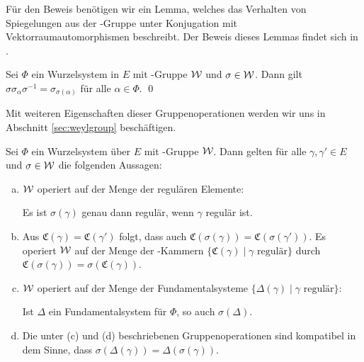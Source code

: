Für den Beweis benötigen wir ein Lemma, welches das Verhalten von Spiegelungen aus der \weyl\hyp{}Gruppe unter Konjugation mit Vektorraumautomorphismen beschreibt. 
Der Beweis dieses Lemmas findet sich in \cite[S.43]{humphreys1972introduction}.

\begin{lem}
  \label{lem:conjReflection}
  Sei $\Phi$ ein Wurzelsystem in $E$ mit \weyl\hyp{}Gruppe $\mathcal{W}$ und $\sigma \in \mathcal{W}$.
  Dann gilt $\sigma \sigma_\alpha \sigma^{-1} = \sigma_{\sigma(\alpha)}$ für alle $\alpha \in \Phi$. \qed
\end{lem}

Mit weiteren Eigenschaften dieser Gruppenoperationen werden wir uns in Abschnitt \ref{sec:weylgroup} beschäftigen.

\begin{prop}
  \label{prop:groupOp}
  Sei $\Phi$ ein Wurzelsystem über $E$ mit \weyl\hyp{}Gruppe $\mathcal{W}$.
  Dann gelten für alle $\gamma, \gamma' \in E$ und $\sigma \in \mathcal{W}$ die folgenden Aussagen:
  \begin{enumerate}[(a)]
    \item $\mathcal{W}$ operiert auf der Menge der regulären Elemente: 
      \begin{addmargin}[2em]{2em}
        Es ist $\sigma(\gamma)$ genau dann regulär, wenn $\gamma$ regulär ist.
      \end{addmargin}
      
    \item Aus $\mathfrak{C}(\gamma) = \mathfrak{C}(\gamma')$ folgt, dass auch $\mathfrak{C}(\sigma(\gamma)) = \mathfrak{C}(\sigma(\gamma'))$. 
      Es operiert $\mathcal{W}$ auf der Menge der \weyl\hyp{}Kammern $\{\mathfrak{C}(\gamma) \mid \gamma \text{ regulär}\}$ durch $\mathfrak{C}(\sigma(\gamma)) = \sigma(\mathfrak{C}(\gamma))$.

    \item $\mathcal{W}$ operiert auf der Menge der Fundamentalsysteme $\{\Delta(\gamma) \mid \gamma \text{ regulär}\}$: 
      \begin{addmargin}[2em]{2em}
        Ist $\Delta$ ein Fundamentalsystem für $\Phi$, so auch $\sigma(\Delta)$. 
      \end{addmargin}

    \item Die unter (c) und (d) beschriebenen Gruppenoperationen sind kompatibel in dem Sinne, dass 
      $\sigma(\Delta(\gamma)) = \Delta(\sigma(\gamma))$.
  \end{enumerate}
\end{prop}

